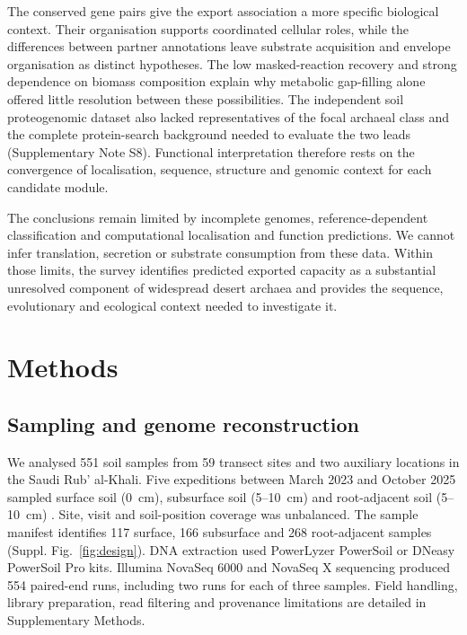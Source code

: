 \documentclass[11pt]{article}
\begin{document}
The conserved gene pairs give the export association a more specific biological context. Their organisation supports coordinated cellular roles, while the differences between partner annotations leave substrate acquisition and envelope organisation as distinct hypotheses. The low masked-reaction recovery and strong dependence on biomass composition explain why metabolic gap-filling alone offered little resolution between these possibilities. The independent soil proteogenomic dataset also lacked representatives of the focal archaeal class and the complete protein-search background needed to evaluate the two leads (Supplementary Note S8). Functional interpretation therefore rests on the convergence of localisation, sequence, structure and genomic context for each candidate module.

The conclusions remain limited by incomplete genomes, reference-dependent classification and computational localisation and function predictions. We cannot infer translation, secretion or substrate consumption from these data. Within those limits, the survey identifies predicted exported capacity as a substantial unresolved component of widespread desert archaea and provides the sequence, evolutionary and ecological context needed to investigate it.

\section*{Methods}

\subsection*{Sampling and genome reconstruction}

We analysed 551 soil samples from 59 transect sites and two auxiliary locations in the Saudi Rub' al-Khali. Five expeditions between March 2023 and October 2025 sampled surface soil (0~cm), subsurface soil (5--10~cm) and root-adjacent soil (5--10~cm) \citep{rubalkhali_datapaper,tawfiq2026companion}. Site, visit and soil-position coverage was unbalanced. The sample manifest identifies 117 surface, 166 subsurface and 268 root-adjacent samples (Suppl. Fig.~\ref{fig:design}). DNA extraction used PowerLyzer PowerSoil or DNeasy PowerSoil Pro kits. Illumina NovaSeq 6000 and NovaSeq X sequencing produced 554 paired-end runs, including two runs for each of three samples. Field handling, library preparation, read filtering and provenance limitations are detailed in Supplementary Methods.
\end{document}
